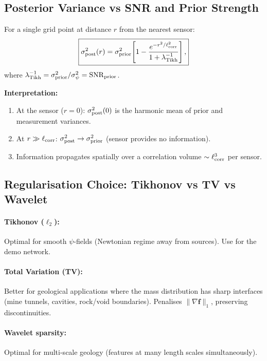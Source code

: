 \documentclass[aps,prd,twocolumn,superscriptaddress,nofootinbib]{revtex4-2}
\newcommand{\SNR}{\mathrm{SNR}}
\begin{document}
\subsection{Posterior Variance vs SNR and Prior Strength}

For a single grid point at distance $r$ from the nearest sensor:
\begin{equation}
\boxed{
\sigma_{\rm post}^2(r) = \sigma_{\rm prior}^2\!\left[
1 - \frac{e^{-r^2/\ell_{\rm corr}^2}}
{1 + \lambda_{\rm Tikh}^{-1}}
\right],
}
\label{eq:post-var}
\end{equation}
where $\lambda_{\rm Tikh}^{-1} = \sigma_{\rm prior}^2/\sigma_\psi^2 = \SNR_{\rm prior}$.

\textbf{Interpretation:}
\begin{enumerate}
\item At the sensor ($r=0$): $\sigma_{\rm post}^2(0)$ is the harmonic mean
  of prior and measurement variances.
\item At $r \gg \ell_{\rm corr}$: $\sigma_{\rm post}^2 \to \sigma_{\rm prior}^2$
  (sensor provides no information).
\item Information propagates spatially over a correlation volume
  $\sim\ell_{\rm corr}^3$ per sensor.
\end{enumerate}

\subsection{Regularisation Choice: Tikhonov vs TV vs Wavelet}

\paragraph{Tikhonov ($\ell_2$):} Optimal for smooth $\psi$-fields
(Newtonian regime away from sources).  Use for the demo network.

\paragraph{Total Variation (TV):} Better for geological applications
where the mass distribution has sharp interfaces (mine tunnels,
cavities, rock/void boundaries).  Penalises $\|\nabla\mathbf{f}\|_1$,
preserving discontinuities.

\paragraph{Wavelet sparsity:} Optimal for multi-scale geology
(features at many length scales simultaneously).
\end{document}
